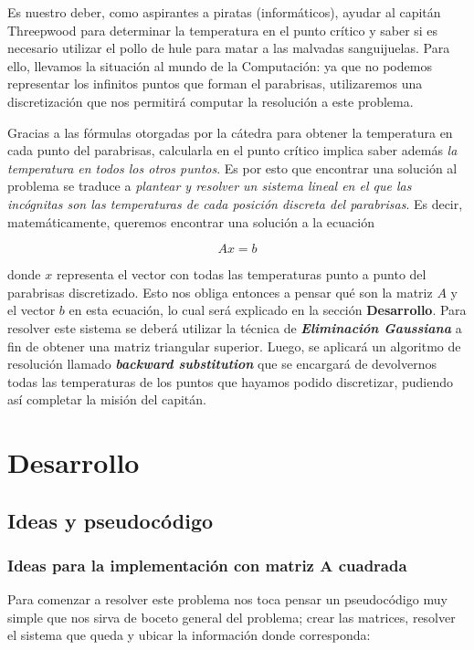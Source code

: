 \vspace{\baselineskip}
\par 
Es nuestro deber, como aspirantes a piratas (informáticos), ayudar al capitán Threepwood para determinar la temperatura en el punto crítico y saber si es necesario utilizar el pollo de hule para matar a las malvadas sanguijuelas. Para ello, llevamos la situación al mundo de la Computación: ya que no podemos representar los infinitos puntos que forman el parabrisas, utilizaremos una discretización que nos permitirá computar la resolución a este problema. 
\par
Gracias a las fórmulas otorgadas por la cátedra para obtener la temperatura en cada punto del parabrisas, calcularla en el punto crítico implica saber además \textit{la temperatura en todos los otros puntos}. Es por esto que encontrar una solución al problema se traduce a \textit{plantear y resolver un sistema lineal en el que las incógnitas son las temperaturas de cada posición discreta del parabrisas}. Es decir, matemáticamente, queremos encontrar una solución a la ecuación

\[ Ax = b \]

donde $x$ representa el vector con todas las temperaturas punto a punto del parabrisas discretizado. Esto nos obliga entonces a pensar qué son la matriz $A$ y el vector $b$ en esta ecuación, lo cual será explicado en la sección \textbf{Desarrollo}. Para resolver este sistema se deberá utilizar la técnica de \textbf{\textit{Eliminación Gaussiana}} a fin de obtener una matriz triangular superior. Luego, se aplicará un algoritmo de resolución llamado \textbf{\textit{backward substitution}} que se encargará de devolvernos todas las temperaturas de los puntos que hayamos podido discretizar, pudiendo así completar la misión del capitán.

\section{Desarrollo}

\subsection{Ideas y pseudocódigo}

\subsubsection{Ideas para la implementación con matriz A cuadrada}

Para comenzar a resolver este problema nos toca pensar un pseudocódigo muy simple que nos sirva de boceto general del problema; crear las matrices, resolver el sistema que queda y ubicar la información donde corresponda:

